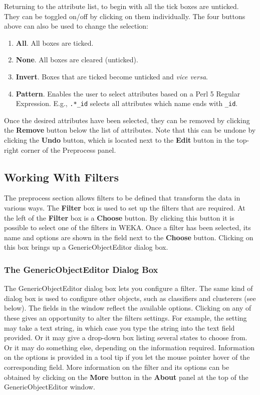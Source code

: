\documentclass[a4paper]{article}
\begin{document}
Returning to the attribute list, to begin with all the tick boxes are unticked.
They can be toggled on/off by clicking on them individually.  The four buttons
above can also be used to change the selection:

\begin{enumerate}
\item \textbf{All}.
All boxes are ticked.
\item \textbf{None}.
All boxes are cleared (unticked).
\item \textbf{Invert}.
Boxes that are ticked become unticked and {\em vice versa\/}.
\item \textbf{Pattern}.
Enables the user to select attributes based on a Perl 5 Regular Expression. E.g., 
\texttt{.*\_id} selects all attributes which name ends with \texttt{\_id}.
\end{enumerate}

Once the desired attributes have been selected, they can be removed by
clicking the \textbf{Remove} button below the list of attributes.
Note that this can be undone by clicking the \textbf{Undo} button,
which is located next to the \textbf{Edit} button in the top-right
corner of the Preprocess panel.

\subsection{Working With Filters}

The preprocess section allows filters to be defined that transform the
data in various ways.  The \textbf{Filter} box is used to set up the
filters that are required.  At the left of the \textbf{Filter} box is
a \textbf{Choose} button. By clicking this button it is possible to
select one of the filters in WEKA. Once a filter has been selected,
its name and options are shown in the field next to the
\textbf{Choose} button. Clicking on this box brings up a
GenericObjectEditor dialog box.

\subsubsection*{The GenericObjectEditor Dialog Box}

The GenericObjectEditor dialog box lets you configure a filter. The
same kind of dialog box is used to configure other objects, such as
classifiers and clusterers (see below). The fields in the window
reflect the available options.  Clicking on any of these gives an
opportunity to alter the filters settings. For example, the setting
may take a text string, in which case you type the string into the
text field provided.  Or it may give a drop-down box listing several
states to choose from.  Or it may do something else, depending on the
information required. Information on the options is provided in a tool
tip if you let the mouse pointer hover of the corresponding
field. More information on the filter and its options can be obtained
by clicking on the \textbf{More} button in the \textbf{About} panel at
the top of the GenericObjectEditor window.
\end{document}
